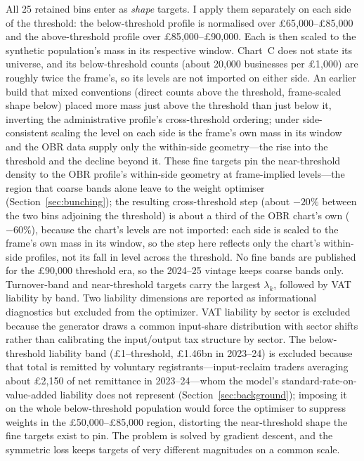 All 25 retained bins enter as \emph{shape} targets. I apply them separately on
each side of the threshold: the below-threshold profile is normalised over
\pounds65{,}000--\pounds85{,}000 and the above-threshold profile over
\pounds85{,}000--\pounds90{,}000. Each is then scaled to the synthetic
population's mass in its respective window. Chart~C does not state its universe,
and its below-threshold counts (about 20{,}000 businesses per \pounds1{,}000)
are roughly twice the frame's, so its levels
are not imported on either side. An earlier build that mixed conventions
(direct counts above the threshold, frame-scaled shape below) placed more
mass just above the threshold than just below it, inverting the
administrative profile's cross-threshold ordering; under side-consistent
scaling the level on each side is the frame's own mass in its window
and the OBR data supply only the within-side geometry---the rise into the
threshold and the decline beyond it. These fine targets pin the
near-threshold density to the OBR profile's within-side geometry at
frame-implied levels---the region that coarse bands alone leave to the weight
optimiser (Section~\ref{sec:bunching}); the resulting cross-threshold step
(about $-20\%$ between the two bins adjoining the threshold) is about a third of the OBR chart's own ($-60\%$), because the chart's
levels are not imported: each side is scaled to the frame's own mass in its window, so the step here reflects only the chart's within-side profiles, not its fall in level across the threshold. No fine bands are published for the
\pounds90{,}000 threshold era, so the 2024--25 vintage keeps coarse bands
only. Turnover-band and near-threshold targets carry the largest $\lambda_k$,
followed by VAT liability by band. Two liability dimensions are reported as
informational diagnostics but excluded from the optimizer. VAT liability by
sector is excluded because the generator draws a common input-share
distribution with sector shifts rather than calibrating the input/output tax
structure by sector. The below-threshold liability band
(\pounds1--threshold, \pounds1.46bn in 2023--24) is excluded because that
total is remitted by voluntary registrants---input-reclaim traders averaging
about \pounds2{,}150 of net remittance in 2023--24---whom the model's
standard-rate-on-value-added liability does not represent
(Section~\ref{sec:background}); imposing it on the whole below-threshold
population would force the optimiser to suppress weights in the
\pounds50{,}000--\pounds85{,}000 region, distorting the near-threshold
shape the fine targets exist to pin. The problem is
solved by gradient descent, and the symmetric loss keeps targets of very
different magnitudes on a common scale.

